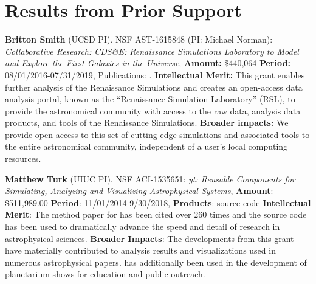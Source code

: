 \section{Results from Prior Support}

\noindent \textbf{Britton Smith} (UCSD PI). NSF AST-1615848 (PI: Michael
Norman): \textit{Collaborative Research: CDS\&E: Renaissance Simulations
Laboratory to Model and Explore the First Galaxies in the Universe},
\textbf{Amount:} \$440,064
\textbf{Period:} 08/01/2016-07/31/2019,
Publications:
\citep{2016ApJ...832L...5X, 2016ApJ...833...84X, Barrow17_FL2,
2017ApJ...845...47T, 2017ApJ...847...59H}.
\textbf{Intellectual Merit:} This grant enables further analysis of
the Renaissance Simulations \citep{2015ApJ...807L..12O} and creates
an open-access data analysis portal, known as the ``Renaissance Simulation
Laboratory'' (RSL), to provide the astronomical community with access
to the raw data, analysis data products, and tools of the Renaissance
Simulations.
\textbf{Broader impacts:}
We provide open access to this set of cutting-edge
simulations and associated tools to the entire astronomical community,
independent of a user's local computing resources.

\noindent \textbf{Matthew Turk} (UIUC PI).  
NSF ACI-1535651: \textit{yt: Reusable Components for Simulating,
Analyzing and Visualizing Astrophysical Systems},
\textbf{Amount}: \$511,989.00
\textbf{Period}: 11/01/2014-9/30/2018,
\textbf{Products}: \yt{} source code
\textbf{Intellectual Merit}: The method paper for \yt{} has been cited over
260 times and the source code has been used to dramatically advance the speed
and detail of research in astrophysical sciences.
\textbf{Broader Impacts}: The developments from this grant have materially
contributed to analysis results and visualizations used in numerous
astrophysical papers. \yt{} has additionally been used in the development
of planetarium shows for education and public outreach.
